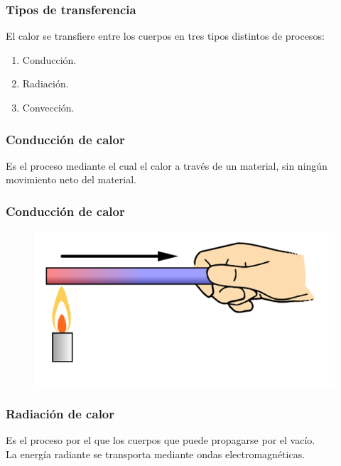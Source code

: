 \documentclass[14pt]{beamer}
\begin{document}
\begin{frame}
\frametitle{Tipos de transferencia}
El calor se transfiere entre los cuerpos en tres tipos distintos de procesos:
\pause
{}
\begin{enumerate}[<+->]
\item Conducción.
\item Radiación.
\item Convección.
\end{enumerate}
\end{frame}
\begin{frame}
\frametitle{Conducción de calor}
Es el proceso mediante el cual el calor  a través de un material, \pause sin ningún
movimiento neto del material.
\end{frame}
\begin{frame}
\frametitle{Conducción de calor}
\begin{figure}
    \centering
    \includegraphics[scale=0.5]{Imagenes/Calor_03.png}
\end{figure}
\end{frame}
\begin{frame}
\frametitle{Radiación de calor}
Es el proceso por el que los cuerpos  que puede propagarse por el vacío.
\\
\bigskip
\pause
La energía radiante se transporta mediante ondas electromagnéticas.
\end{frame}
\end{document}
